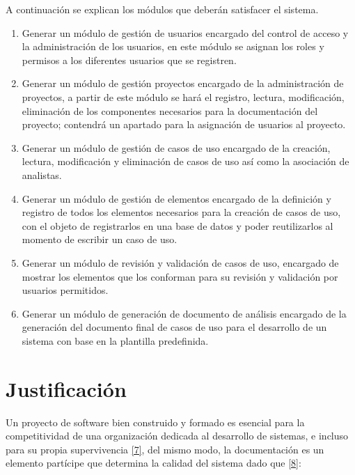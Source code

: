 A continuación se explican los módulos que deberán satisfacer el sistema.

\begin{enumerate}
	\item Generar un módulo de gestión de usuarios encargado del control de acceso y la administración de los usuarios, en este módulo se asignan los roles y permisos a los diferentes usuarios que se registren.
	\item Generar un módulo de gestión proyectos encargado de la administración de proyectos, a partir de este módulo se hará el registro, lectura, modificación, eliminación de los componentes necesarios para la documentación del proyecto; contendrá un apartado para la asignación de usuarios al proyecto.
	\item Generar un módulo de gestión de casos de uso encargado de la creación, lectura, modificación y eliminación de casos de uso así como la asociación de analistas.
	\item Generar un módulo de gestión de elementos encargado de la definición y registro de todos los elementos necesarios para la creación de casos de uso, con el objeto de registrarlos en una base de datos y poder reutilizarlos al momento de escribir un caso de uso.
	\item Generar un módulo de revisión y validación de casos de uso, encargado de mostrar los elementos que los conforman para su revisión y validación por usuarios permitidos.
	\item Generar un módulo de generación de documento de análisis encargado de la generación del documento final de casos de uso para el desarrollo de un sistema con base en la plantilla predefinida.
\end{enumerate}
\newpage

\section{Justificación}
Un proyecto de software bien construido y formado es esencial para la competitividad de una organización dedicada al desarrollo de sistemas, e incluso para su propia supervivencia \hyperlink{b07}{[7]}, del mismo modo, la documentación es un elemento partícipe que determina la calidad del sistema dado que \hyperlink{b08}{[8]}:

